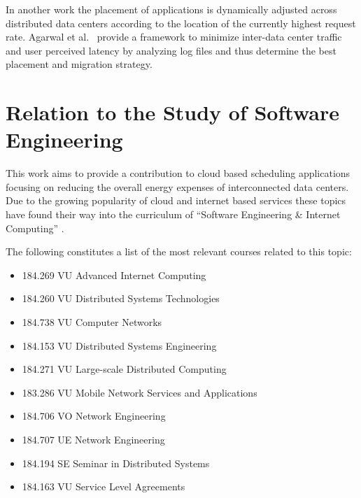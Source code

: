 \documentclass[a4paper]{article}
\begin{document}
In another work \cite{malet2010resource} the placement of applications is dynamically adjusted across distributed data centers according to the location of the currently highest request rate. Agarwal et al.\ \cite{agarwal2010volley} provide a framework to minimize inter-data center traffic and user perceived latency by analyzing log files and thus determine the best placement and migration strategy. 


\section{Relation to the Study of Software Engineering}

This work aims to provide a contribution to cloud based scheduling applications focusing on reducing the overall energy expenses of interconnected data centers. Due to the growing popularity of cloud and internet based services these topics have found their way into the curriculum of ``Software Engineering \& Internet Computing'' \cite{curriculum2013curriculum}. 

The following constitutes a list of the most relevant courses related to this topic:


\begin{itemize}

\item{184.269 VU Advanced Internet Computing}
\item{184.260 VU Distributed Systems Technologies}
\item{184.738 VU Computer Networks}
\item{184.153 VU Distributed Systems Engineering}
\item{184.271 VU Large-scale Distributed Computing}
\item{183.286 VU Mobile Network Services and Applications}
\item{184.706 VO Network Engineering}
\item{184.707 UE Network Engineering}
\item{184.194 SE Seminar in Distributed Systems}
\item{184.163 VU Service Level Agreements }

\end{itemize}

\printbibliography
\end{document}
